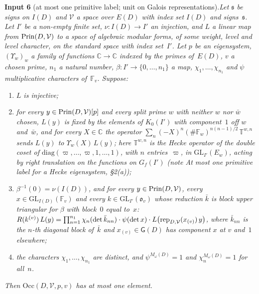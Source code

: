 \documentclass[11pt,a4paper]{article}
\newcommand{\F}{\mathbb{F}}
\newcommand{\m}[1]{\mbox{$#1$}}        %
\theoremstyle{plainx}
\theoremstyle{uprightx}
\newcommand{\cV}{{\mathcal V}}
\newcommand{\fs}{{\mathfrak s}}
\newcommand{\sG}{{\mathsf G}}
\newcommand{\Occ}{\mathrm{Occ}}
\newcommand{\GL}{\mathrm{GL}}
\begin{document}
{\vspace{3pt}\label{i:6}\textbf{Input 6} (at most one primitive label; unit on Galois
representations).\enspace \emph{Let $\fs$ be signs on $I(D)$ and $\cV$ a space over $E(D)$ with index set $I(D)$
and signs~$\fs$. Let $I'$ be a non-empty finite set, \m{\nu\colon I(D)\to I'} an injection, and $L$ a linear map
from \m{\Prin{D}{\cV}} to a space of algebraic modular forms, of some weight, level and level character, on the
standard space with index set~$I'$. Let $p$ be an eigensystem, \m{(\Upsilon_w)_w} a family of functions
\m{\mathbb C\to\mathbb C} indexed by the primes of~$E(D)$, $v$ a chosen prime, $n_1$ a natural number,
\m{\beta\colon I'\to\{0,\dots,n_1\}} a map, \m{\chi_1,\dots,\chi_{n_1}} and $\psi$ multiplicative characters
of~$\F_v$. Suppose:}
\begin{enumerate}[label=\textup{(\roman*)},leftmargin=2.3em,itemsep=1pt]
\item \emph{$L$ is injective;}
\item \emph{for every \m{y\in\Prin{D}{\cV}[p]} and every split prime $w$ with neither $w$ nor $\bar w$ chosen,
$L(y)$ is fixed by the elements of $K_0(I')$ with component~$1$ off $w$ and~$\bar w$, and for every
\m{X\in\mathbb C} the operator \m{\sum_{n}(-X)^n(\#\F_w)^{n(n-1)/2}\,\mathbb T^{w,n}} sends $L(y)$ to
\m{\Upsilon_w(X)\,L(y)}; here \m{\mathbb T^{w,n}} is the Hecke operator of the double coset of
\m{\mathrm{diag}(\varpi,\dots,\varpi,1,\dots,1)}, with $n$ entries~$\varpi$, in \m{\GL_{I'}(E_w)}, acting by right
translation on the functions on \m{G_f(I')} (note \emph{At most one primitive label for a Hecke eigensystem},
§2(a));}
\item \emph{\m{\beta^{-1}(0)=\nu(I(D))}, and for every \m{y\in\Prin{D}{\cV}}, every \m{x\in\GL_{I(D)}(\F_v)} and
every \m{k\in\GL_{I'}(\mathfrak{o}_v)} whose reduction $\bar k$ is block upper triangular for $\beta$ with block~$0$ equal
to~$x$:
\m{R(k^{(v)})\,L(y)=\prod_{n=1}^{n_1}\chi_n(\det\bar k_{nn})\cdot\psi(\det x)\cdot L\bigl(\prep{D}{\cV}(x_{(v)})\,y\bigr)},
where $\bar k_{nn}$ is the $n$-th diagonal block of~$\bar k$ and \m{x_{(v)}\in\sG(D)} has component $x$ at $v$
and~$1$ elsewhere;}
\item \emph{the characters \m{\chi_1,\dots,\chi_{n_1}} are distinct, and \m{\psi^{M_\omega(D)}=1} and
\m{\chi_n^{M_\omega(D)}=1} for all~$n$.}
\end{enumerate}
\emph{Then \m{\Occ(D,\cV,p,v)} has at most one element.}

}
\end{document}
